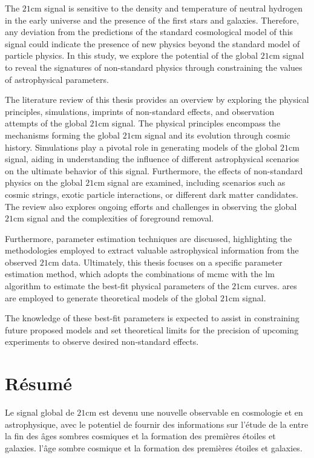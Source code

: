 \documentclass[12pt, TexShade, letterpaper]{report}
\begin{document}
The $\mathrm{21cm}$ signal is sensitive to the density and temperature of neutral hydrogen in the early universe and the presence of the first stars and galaxies. Therefore, any deviation from the predictions of the standard cosmological model of this signal could indicate the presence of new physics beyond the standard model of particle physics.
In this study, we explore the potential of the global $\mathrm{21cm}$ signal to reveal the signatures of non-standard physics through constraining the values of astrophysical parameters.\par

The literature review of this thesis provides an overview by exploring the physical principles, simulations, imprints of non-standard effects, and observation attempts of the global $\mathrm{21cm}$ signal. The physical principles encompass the mechanisms forming the global $\mathrm{21cm}$ signal and its evolution through cosmic history. Simulations play a pivotal role in generating models of the global $\mathrm{21cm}$ signal, aiding in understanding the influence of different astrophysical scenarios on the ultimate behavior of this signal. Furthermore, the effects of non-standard physics on the global $\mathrm{21cm}$ signal are examined, including scenarios such as cosmic strings, exotic particle interactions, or different dark matter candidates. The review also explores ongoing efforts and challenges in observing the global $\mathrm{21cm}$ signal and the complexities of foreground removal.\par

Furthermore, parameter estimation techniques are discussed, highlighting the methodologies employed to extract valuable astrophysical information from the observed $\mathrm{21cm}$ data. Ultimately, this thesis focuses on a specific parameter estimation method, which adopts the combinations of \gls{mcmc} with the \gls{lm} algorithm to estimate the best-fit physical parameters of the $\mathrm{21cm}$ curves. \gls{ares} are employed to generate theoretical models of the global $\mathrm{21cm}$ signal.\par

The knowledge of these best-fit parameters is expected to assist in constraining future proposed models and set theoretical limits for the precision of upcoming experiments to observe desired non-standard effects.\par
\chapter*{Résumé}
	\label{chap:frAbstract}
Le signal global de $\mathrm{21cm}$ est devenu une nouvelle observable en cosmologie et en astrophysique, avec le potentiel de fournir des informations sur l'étude de la  entre la fin des âges sombres cosmiques et la formation des premières étoiles et galaxies. l'âge sombre cosmique et la formation des premières étoiles et galaxies.\par
\end{document}
